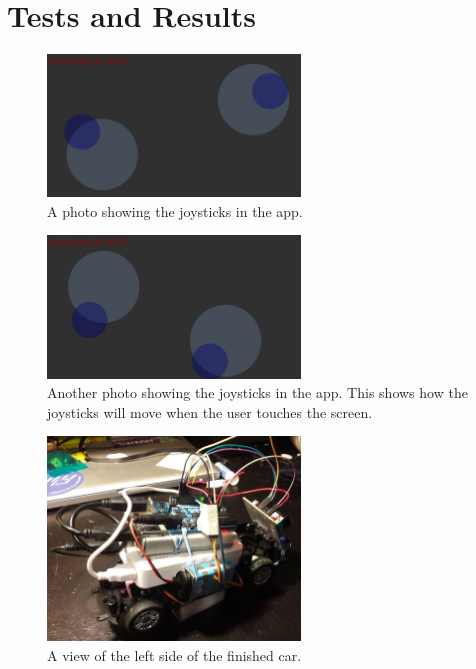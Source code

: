 \section{Tests and Results}
\par
\begin{figure}[H]
\centering
  \includegraphics[width=0.6\textwidth]{sections/testRes/app1}
    \caption{A photo showing the joysticks in the app.}
\end{figure}
\begin{figure}[H]
\centering
  \includegraphics[width=0.6\textwidth]{sections/testRes/app2}
    \caption{Another photo showing the joysticks in the app. This shows how the joysticks will move when the user touches the screen.}
\end{figure}
\begin{figure}[H]
\centering
  \includegraphics[width=0.6\textwidth]{sections/testRes/left}
    \caption{A view of the left side of the finished car.}
\end{figure}
